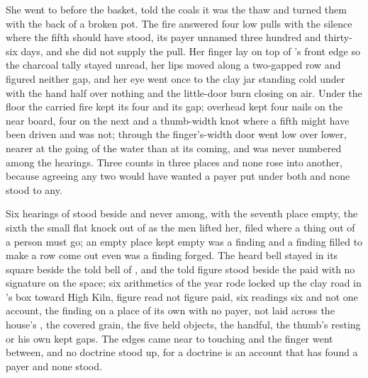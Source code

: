 She went to  before the basket, told the coals it was the thaw and turned them with the back of a broken pot. The fire answered four low pulls with the silence where the fifth should have stood, its payer unnamed three hundred and thirty-six days, and she did not supply the pull. Her finger lay on top of 's front edge so the charcoal tally stayed unread, her lips moved along a two-gapped row and figured neither gap, and her eye went once to the clay jar standing cold under  with the hand half over nothing and the little-door burn closing on air. Under the floor the carried fire kept its four and its gap; overhead  kept four nails on the near board, four on the next and a thumb-width knot where a fifth might have been driven and was not; through the finger's-width door  went low over lower, nearer at the going of the water than at its coming, and was never numbered among the hearings. Three counts in three places and none rose into another, because agreeing any two would have wanted a payer put under both and none stood to any.

Six hearings of  stood beside and never among, with the seventh place empty, the sixth the small flat knock out of  as the men lifted her, filed where a thing out of a person must go; an empty place kept empty was a finding and a finding filled to make a row come out even was a finding forged. The heard bell stayed in its square beside the told bell of , and the told figure stood beside the paid with no signature on the space; six arithmetics of the year rode locked up the clay road in 's box toward High Kiln, figure read not figure paid, six readings six and not one account, the finding on a place of its own with no payer, not laid across the house's , the covered grain, the five held objects, the handful, the thumb's resting or his own kept gaps. The edges came near to touching and the finger went between, and no doctrine stood up, for a doctrine is an account that has found a payer and none stood.

